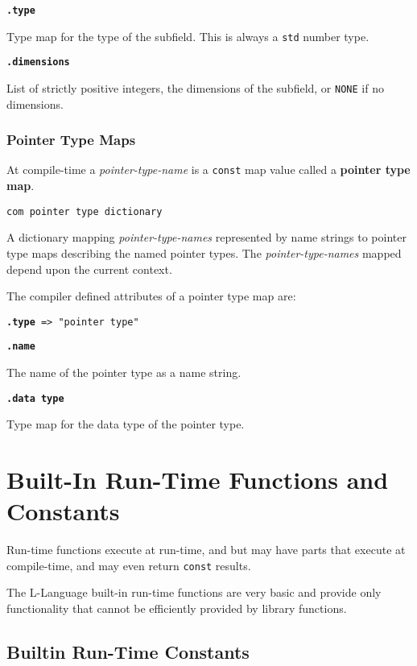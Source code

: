 \documentclass[12pt]{article}
\newcommand{\key}[1]{{\rm \bfseries #1}}
\newcommand{\ttkey}[1]{{\tt \bfseries #1}}
\newenvironment{indpar}[1][0.3in]%
	{\begin{list}{}%
		     {\setlength{\itemsep}{0in}%
		      \setlength{\topsep}{0in}%
		      \setlength{\parsep}{1ex}%
		      \setlength{\labelwidth}{#1}%
		      \setlength{\leftmargin}{#1}%
		      \addtolength{\leftmargin}{\labelsep}}%
	 \item}%
	{\end{list}}
\begin{document}
\ttkey{.type}
\begin{indpar}
Type map for the type of the subfield.
This is always a {\tt std} number type.
\end{indpar}

\ttkey{.dimensions}
\begin{indpar}
List of strictly positive integers,
the dimensions of the subfield, or {\tt NONE} if no dimensions.
\end{indpar}

\subsubsection{Pointer Type Maps}
\label{POINTER-TYPE-MAPS}

At compile-time a {\em pointer-type-name} is a {\tt const} map value
called a \key{pointer type map}.

{\tt com pointer type dictionary}
\begin{indpar}
A dictionary mapping {\em pointer-type-names}
represented by name strings to pointer type maps describing the
named pointer types.  The {\em pointer-type-names} mapped depend upon
the current context.
\end{indpar}

The compiler defined attributes of a pointer type map are:

{\tt \ttkey{.type} => "pointer type"}

\ttkey{.name}
\begin{indpar}
The name of the pointer type as a name string.
\end{indpar}

\ttkey{.data type}
\begin{indpar}
Type map for the data type of the pointer type.
\end{indpar}

\section{Built-In Run-Time Functions and Constants}

Run-time functions execute at run-time, and but may have
parts that execute at compile-time, and may even return
{\tt const} results.

The L-Language built-in run-time functions are very basic
and provide only functionality that cannot be efficiently
provided by library functions.

\subsection{Builtin Run-Time Constants}
\label{BUILTIN-RUN-TIME-CONSTANTS}
\end{document}
